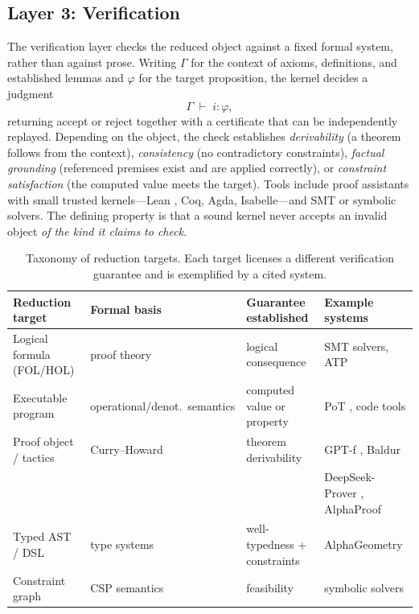 \documentclass[11pt,a4paper]{article}
\theoremstyle{plain}
\theoremstyle{definition}
\theoremstyle{remark}
\begin{document}
\subsection{Layer 3: Verification}
The verification layer checks the reduced object against a fixed formal
system, rather than against prose. Writing $\Gamma$ for the context of
axioms, definitions, and established lemmas and $\varphi$ for the target
proposition, the kernel decides a judgment
\begin{equation}
\Gamma \;\vdash\; i : \varphi ,
\end{equation}
returning accept or reject together with a certificate that can be
independently replayed. Depending on the object, the check establishes
\emph{derivability} (a theorem follows from the context),
\emph{consistency} (no contradictory constraints), \emph{factual
grounding} (referenced premises exist and are applied correctly), or
\emph{constraint satisfaction} (the computed value meets the target).
Tools include proof assistants with small trusted kernels---Lean
\citep{demoura2021lean4}, Coq, Agda, Isabelle---and SMT or symbolic
solvers. The defining property is that a sound kernel never accepts an
invalid object \emph{of the kind it claims to check}.

\begin{table}[t]
\centering
\caption{Taxonomy of reduction targets. Each target licenses a different
verification guarantee and is exemplified by a cited system.}
\label{tab:taxonomy}
\small
\begin{tabular}{@{}llll@{}}
\toprule
\textbf{Reduction target} & \textbf{Formal basis} & \textbf{Guarantee established} & \textbf{Example systems}\\
\midrule
Logical formula (FOL/HOL) & proof theory & logical consequence & SMT solvers, ATP\\
Executable program & operational/denot.\ semantics & computed value or property &
  PoT \citep{chen2023pot}, code tools\\
Proof object / tactics & Curry--Howard & theorem derivability &
  GPT-f \citep{polu2020gptf}, Baldur \citep{first2023baldur}\\
 & & & DeepSeek-Prover \citep{xin2024deepseekprover},
  AlphaProof \citep{hubert2025alphaproof}\\
Typed AST / DSL & type systems & well-typedness + constraints &
  AlphaGeometry \citep{trinh2024alphageometry}\\
Constraint graph & CSP semantics & feasibility & symbolic solvers\\
\bottomrule
\end{tabular}
\end{table}
\end{document}
